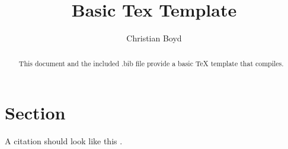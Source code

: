 \documentclass{article}
\begin{document}
\title{Basic Tex Template}

\author{Christian Boyd}

\maketitle

\tableofcontents

\begin{abstract}
    This document and the included .bib file provide a basic TeX template that compiles.
\end{abstract}

\section{Section}
A citation should look like this \cite{MyCitation}.




\end{document}
